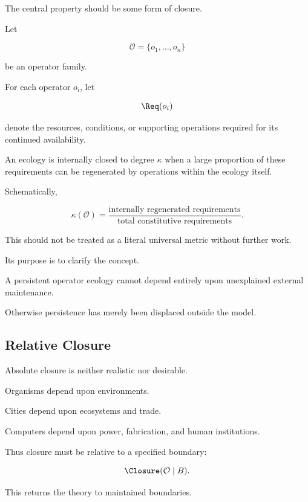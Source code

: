 \documentclass[11pt]{article}
\theoremstyle{remark}
\begin{document}
The central property should be some form of closure.

Let

\begin{equation}
\mathcal{O}
=
\{o_1,\ldots,o_n\}
\end{equation}

be an operator family.

For each operator $o_i$, let

\begin{equation}
\Req(o_i)
\end{equation}

denote the resources, conditions, or supporting operations required for its continued availability.

An ecology is internally closed to degree $\kappa$ when a large proportion of these requirements can be regenerated by operations within the ecology itself.

Schematically,

\begin{equation}
\kappa(\mathcal{O})
=
\frac{
\text{internally regenerated requirements}
}{
\text{total constitutive requirements}
}.
\end{equation}

This should not be treated as a literal universal metric without further work.

Its purpose is to clarify the concept.

A persistent operator ecology cannot depend entirely upon unexplained external maintenance.

Otherwise persistence has merely been displaced outside the model.

\subsection{Relative Closure}

Absolute closure is neither realistic nor desirable.

Organisms depend upon environments.

Cities depend upon ecosystems and trade.

Computers depend upon power, fabrication, and human institutions.

Thus closure must be relative to a specified boundary:

\begin{equation}
\Closure(\mathcal{O}\mid B).
\end{equation}

This returns the theory to maintained boundaries.
\end{document}
